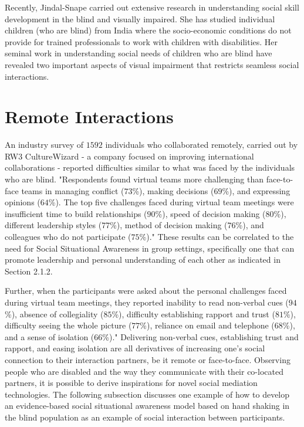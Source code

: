 \documentclass[oneside,11pt]{memoir}
\begin{document}
Recently, Jindal-Snape \cite{jindal-snape_generalization_2004} \cite{jindal-snape_use_2005} \cite{jindal-snape_using_1998} carried out extensive research in understanding social skill development in the blind and visually impaired. She has studied individual children (who are blind) from India where the socio-economic conditions do not provide for trained professionals to work with children with disabilities. Her seminal work in understanding social needs of children who are blind have revealed two important aspects of visual impairment that restricts seamless social interactions.

\section{Remote Interactions}
An industry survey \cite{solomon_challenges_2010} of $1592$ individuals who collaborated remotely, carried out by RW3 CultureWizard - a company focused on improving international collaborations - reported difficulties similar to what was faced by the individuals who are blind. "Respondents found virtual teams more challenging than face-to-face teams in managing conflict ($73$\%), making decisions ($69$\%), and expressing opinions ($64$\%). The top five challenges faced during virtual team meetings were insufficient time to build relationships ($90$\%), speed of decision making ($80$\%), different leadership styles ($77$\%), method of decision making ($76$\%), and colleagues who do not participate ($75$\%)." These results can be correlated to the need for Social Situational Awareness in group settings, specifically one that can promote leadership and personal understanding of each other as indicated in Section 2.1.2.

Further, when the participants were asked about the personal challenges faced during virtual team meetings, they reported inability to read non-verbal cues ($94$\%), absence of collegiality ($85$\%), difficulty establishing rapport and trust ($81$\%), difficulty seeing the whole picture ($77$\%), reliance on email and telephone ($68$\%), and a sense of isolation ($66$\%)." Delivering non-verbal cues, establishing trust and rapport, and easing isolation are all derivatives of increasing one's social connection to their interaction partners, be it remote or face-to-face. Observing people who are disabled and the way they communicate with their co-located partners, it is possible to derive inspirations for novel social mediation technologies. The following subsection discusses one example of how to develop an evidence-based social situational awareness model based on hand shaking in the blind population as an example of social interaction between participants.
\end{document}
